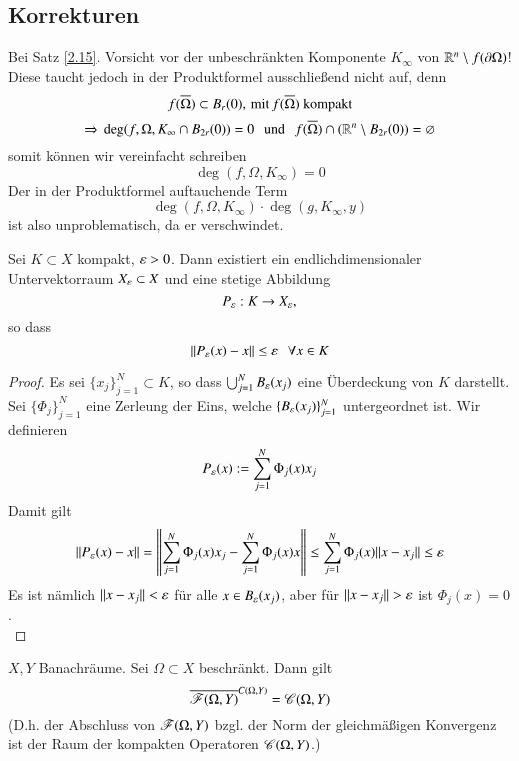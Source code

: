 \subsection*{Korrekturen}

Bei Satz \ref{2.15}. Vorsicht vor der unbeschränkten Komponente $K_\infty$ von $\mathbb{R}^n\setminus f(\partial
\Omega)$! Diese taucht jedoch in der Produktformel ausschließend nicht auf, denn
\[
    f(\overline \Omega)\subset B_r(0), \, \text{mit}\, f(\overline \Omega) \text{ kompakt}
\]
\[
    \Rightarrow \, \deg(f,\Omega,K_\infty\cap B_{2r}(0))=0 \hspace{.25cm} \text{und} \hspace{.25cm} f(\overline \Omega) \cap (\mathbb{R}^n\setminus
    B_{2r}(0))=\varnothing
\]
somit können wir vereinfacht schreiben
\[
    \deg(f,\Omega,K_\infty)=0
\]
Der in der Produktformel auftauchende Term
\[
    \deg(f,\Omega,K_\infty)\cdot \deg(g,K_\infty,y)
\]
ist also unproblematisch, da er verschwindet.\\[0.5cm]

\begin{lem}\label{3.5}
    Sei $K\subset X$ kompakt, $\varepsilon>0$. Dann existiert ein endlichdimensionaler Untervektorraum $X_\varepsilon
    \subset X$ und eine stetige Abbildung
    \[
        P_\varepsilon:K\rightarrow X_\varepsilon,
    \]
    so dass
    \[
        \|P_\varepsilon(x)-x\|\leq \varepsilon \hspace{.25cm} \forall x\in K
    \]
\end{lem}

\begin{proof}
    Es sei $\{x_j\}_{j=1}^N\subset K$, so dass $\bigcup _{j=1}^NB_\varepsilon(x_j)$ eine Überdeckung von $K$
    darstellt. Sei $\{\Phi_j\}_{j=1}^N$ eine Zerleung der Eins, welche $\{B_\varepsilon(x_j)\}_{j=1}^N$
    untergeordnet ist. Wir definieren
    \[
        P_\varepsilon(x):= \sum_{j=1}^N \Phi_j(x)x_j
    \]
    Damit gilt
    \[
        \|P_\varepsilon(x)-x\|=\left\|\sum_{j=1}^N\Phi_j(x)x_j-\sum_{j=1}^N \Phi_j(x)x\right\|
        \leq \sum_{j=1}^N \Phi_j(x)\|x-x_j\|\leq \varepsilon
    \]
    Es ist nämlich $\|x-x_j\|< \varepsilon$ für alle $x\in B_\varepsilon(x_j)$, aber für $\|x-x_j\|>\eps$ ist
    $\Phi_j(x)=0$.
    \[ \]
\end{proof}

\begin{theorem}\label{3.6}
    $X,Y$ Banachräume. Sei $\Omega\subset X$ beschränkt. Dann gilt
    \[
        \overline{\mathscr F(\Omega,Y)}^{C(\Omega,Y)}=\mathscr C(\Omega,Y)
    \]
    (D.h. der Abschluss von $\mathscr F(\Omega,Y)$ bzgl. der Norm der gleichmäßigen Konvergenz ist der Raum
     der kompakten Operatoren $\mathscr C(\Omega,Y)$.)
\end{theorem}

